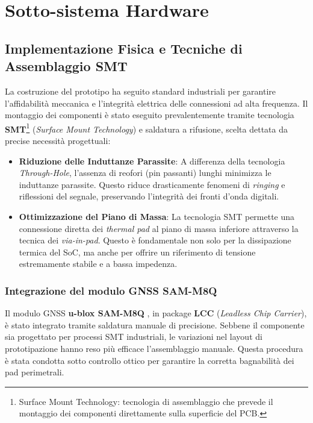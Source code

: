 \newpage
\section{Sotto-sistema Hardware}

\subsection{Implementazione Fisica e Tecniche di Assemblaggio SMT}

La costruzione del prototipo ha seguito standard industriali per garantire l'affidabilità meccanica e l'integrità elettrica delle connessioni ad alta frequenza. Il montaggio dei componenti è stato eseguito prevalentemente tramite tecnologia \textbf{SMT}\footnote{Surface Mount Technology: tecnologia di assemblaggio che prevede il montaggio dei componenti direttamente sulla superficie del PCB.} (\textit{Surface Mount Technology}) e saldatura a rifusione, scelta dettata da precise necessità progettuali:

\begin{itemize}
    \item \textbf{Riduzione delle Induttanze Parassite}: A differenza della tecnologia \textit{Through-Hole}, l'assenza di reofori (pin passanti) lunghi minimizza le induttanze parassite. Questo riduce drasticamente fenomeni di \textit{ringing} e riflessioni del segnale, preservando l'integrità dei fronti d'onda digitali.
    \item \textbf{Ottimizzazione del Piano di Massa}: La tecnologia SMT permette una connessione diretta dei \textit{thermal pad} al piano di massa inferiore attraverso la tecnica dei \textit{via-in-pad}. Questo è fondamentale non solo per la dissipazione termica del SoC, ma anche per offrire un riferimento di tensione estremamente stabile e a bassa impedenza.
\end{itemize}


\subsubsection*{Integrazione del modulo GNSS SAM-M8Q}
Il modulo GNSS \textbf{u-blox SAM-M8Q} \cite{sam_m8q_ds}, in package \textbf{LCC} (\textit{Leadless Chip Carrier}), è stato integrato tramite saldatura manuale di precisione. Sebbene il componente sia progettato per processi SMT industriali, le variazioni nel layout di prototipazione hanno reso più efficace l'assemblaggio manuale. Questa procedura è stata condotta sotto controllo ottico per garantire la corretta bagnabilità dei pad perimetrali.

